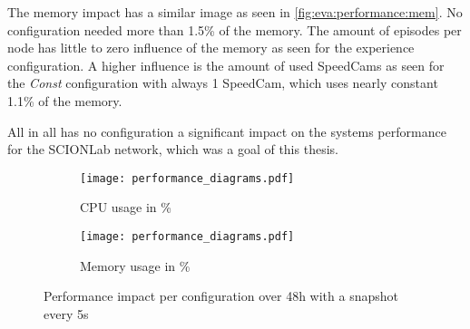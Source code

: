 \documentclass[thesis.tex]{subfiles}
\begin{document}
The memory impact has a similar image as seen in \autoref{fig:eva:performance:mem}. No configuration needed more than 1.5\% of the memory. The amount of episodes per node has little to zero influence of the memory as seen for the experience configuration. A higher influence is the amount of used SpeedCams as seen for the \textit{Const} configuration with always 1 SpeedCam, which uses nearly constant 1.1\% of the memory.

All in all has no configuration a significant impact on the systems performance for the SCIONLab network, which was a goal of this thesis.
\begin{figure}[!h]
	\centering
	\begin{subfigure}{.85\linewidth}
		\centering
		\texttt{[image: performance\_diagrams.pdf]}
		\caption{CPU usage in \%}
		\label{fig:eva:performance:cpu}
	\end{subfigure}
	\hfill
	\begin{subfigure}{.85\linewidth}
		\centering
		\texttt{[image: performance\_diagrams.pdf]}
		\caption{Memory usage in \%}
		\label{fig:eva:performance:mem}
	\end{subfigure}
	\caption{Performance impact per configuration over 48h with a snapshot every 5s}
	\label{fig:eva:performance}
\end{figure}

\subfilebib %
\end{document}
